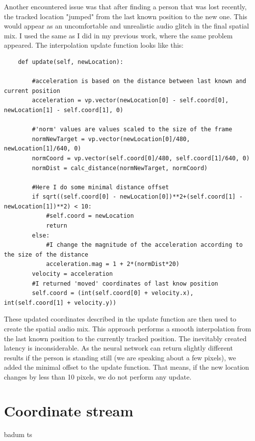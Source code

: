 \documentclass{ctuthesis}
\begin{document}
Another encountered issue was that after finding a person that was lost recently, the tracked location "jumped" from the last known position to the new one. This would appear as an uncomfortable and unrealistic audio glitch in the final spatial mix. I used the same as I did in my previous work, where the same problem appeared. The interpolation update function looks like this:


\begin{lstlisting}
    def update(self, newLocation):
    
        #acceleration is based on the distance between last known and current position
        acceleration = vp.vector(newLocation[0] - self.coord[0], newLocation[1] - self.coord[1], 0)
        
        #'norm' values are values scaled to the size of the frame
        normNewTarget = vp.vector(newLocation[0]/480, newLocation[1]/640, 0)
        normCoord = vp.vector(self.coord[0]/480, self.coord[1]/640, 0)
        normDist = calc_distance(normNewTarget, normCoord)
        
        #Here I do some minimal distance offset
        if sqrt((self.coord[0] - newLocation[0])**2+(self.coord[1] - newLocation[1])**2) < 10:
            #self.coord = newLocation
            return
        else:
            #I change the magnitude of the acceleration according to the size of the distance
            acceleration.mag = 1 + 2*(normDist*20)
        velocity = acceleration
        #I returned 'moved' coordinates of last know position
        self.coord = (int(self.coord[0] + velocity.x), int(self.coord[1] + velocity.y))
\end{lstlisting}
\label{interpolation}
These updated coordinates described in the update function are then used to create the spatial audio mix. This approach performs a smooth interpolation from the last known position to the currently tracked position. The inevitably created latency is inconsiderable. As the neural network can return slightly different results if the person is standing still (we are speaking about a few pixels), we added the minimal offset to the update function. That means, if the new location changes by less than 10 pixels, we do not perform any update.

\section{Coordinate stream}
badum ts
\end{document}
